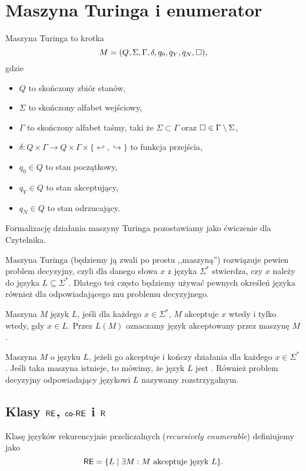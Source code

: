 \section{Maszyna Turinga i enumerator}

\begin{definition}
    Maszyna Turinga to krotka
    \[ M = (Q, \Sigma, \Gamma, \delta, q_0, q_Y, q_N, \square),\]
    gdzie
    \begin{itemize}[noitemsep]
        \item $Q$ to skończony zbiór stanów,
        \item $\Sigma$ to skończony alfabet wejściowy,
        \item $\Gamma$ to skończony alfabet taśmy, taki że $\Sigma \subset \Gamma$ oraz $\square \in \Gamma \setminus \Sigma$,
        \item $\delta : Q \times \Gamma \to Q \times \Gamma \times \{\hookleftarrow , \hookrightarrow\}$ to funkcja przejścia,
        \item $q_0 \in Q$ to stan początkowy,
        \item $q_Y \in Q$ to stan akceptujący,
        \item $q_N \in Q$ to stan odrzucający.
    \end{itemize}
    Formalizację działania maszyny Turinga pozostawiamy jako ćwiczenie dla Czytelnika.
\end{definition}

Maszyna Turinga (będziemy ją zwali po prostu ,,maszyną'') rozwiązuje pewien problem decyzyjny, czyli dla danego słowa $x$ z języka $\Sigma^*$ stwierdza, czy $x$ należy do języka $L \subseteq \Sigma^*$. Dlatego też często będziemy używać pewnych określeń języka również dla odpowiadającego mu problemu decyzyjnego.

Maszyna $M$  język $L$, jeśli dla każdego $x \in \Sigma^*$, $M$ akceptuje $x$ wtedy i tylko wtedy, gdy $x \in L$. Przez $L(M)$ oznaczamy język akceptowany przez maszynę $M$.

Maszyna $M$  o języku $L$, jeżeli go akceptuje i kończy działania dla każdego $x \in \Sigma^*$. Jeśli taka maszyna istnieje, to mówimy, że język $L$ jest . Również problem decyzyjny odpowiadający językowi $L$ nazywamy rozstrzygalnym.

\subsection{Klasy $\textsf{RE}$, $\textsf{co-RE}$ i $\textsf{R}$}
\begin{definition}
    Klasę języków rekurencyjnie przeliczalnych (\textit{recursively enumerable}) definiujemy jako
    \[ \textsf{RE} = \{L \mid \exists M : M \text{ akceptuje język } L \}. \]
\end{definition}

